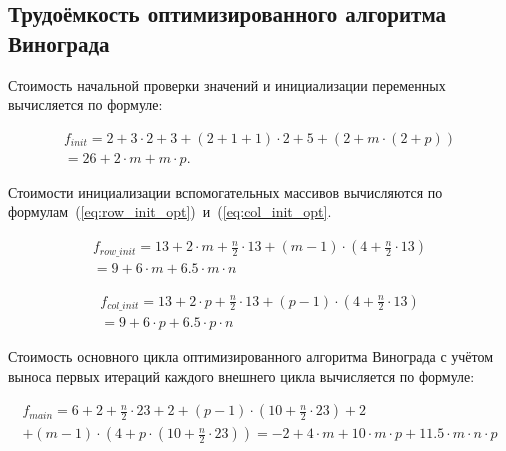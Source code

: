 \subsection{Трудоёмкость оптимизированного алгоритма Винограда}

Стоимость начальной проверки значений и инициализации переменных вычисляется по формуле:

\begin{equation}
    \begin{gathered}
        f_{init} = 2 + 3 \cdot 2 + 3 + (2 + 1 + 1) \cdot 2 + 5 + (2 + m \cdot (2 + p)) \\
        = 26 + 2 \cdot m + m \cdot p.
    \end{gathered} 
\end{equation}

Стоимости инициализации вспомогательных массивов вычисляются по формулам~(\ref{eq:row_init_opt})~и~(\ref{eq:col_init_opt}.

\begin{equation}
    \label{eq:row_init_opt}
    \begin{gathered}
        f_{row\_init} = 13 + 2 \cdot m + \frac{n}{2} \cdot 13 + (m-1)\cdot(4 + \frac{n}{2}\cdot 13) \\ = 9 + 6 \cdot m + 6.5 \cdot m \cdot n
    \end{gathered} 
\end{equation}

\begin{equation}
    \label{eq:col_init_opt}
    \begin{gathered}
        f_{col\_init} = 13 + 2 \cdot p + \frac{n}{2} \cdot 13 + (p-1)\cdot(4 + \frac{n}{2}\cdot 13) \\ = 9 + 6 \cdot p + 6.5 \cdot p \cdot n
    \end{gathered} 
\end{equation}

Стоимость основного цикла оптимизированного алгоритма Винограда с учётом выноса первых итераций каждого внешнего цикла вычисляется по формуле:

\begin{equation}
    \begin{gathered}
        f_{main} = 6 + 2 + \frac{n}{2} \cdot 23 + 2 + (p - 1)\cdot(10 + \frac{n}{2}\cdot 23)
        + 2 \\ + (m - 1) \cdot (4 + p \cdot (10 + \frac{n}{2} \cdot 23)) = -2 + 4\cdot m + 10 \cdot m \cdot p + 11.5 \cdot m \cdot n \cdot p
    \end{gathered}
\end{equation}

